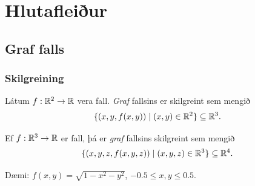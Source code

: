 
\theoremstyle{definition}
\newtheorem{exercise}[theorem]{}





\newbox\mytempbox
\newdimen\mytempdimen

\newcommand\includegraphicscopyright[3][]{%
  \leavevmode\vbox{\vskip3pt\raggedright\setbox\mytempbox=\hbox{\texttt{[image: \#2]}}%
    \mytempdimen=\wd\mytempbox\box\mytempbox\par\vskip1pt%
    \fontsize{3}{3.5}\selectfont{\color{black!25}{\vbox{\hsize=\mytempdimen#3}}}\vskip3pt%
}}

\newenvironment{colortabular}[1]{\medskip\rowcolors[]{1}{blue!20}{blue!10}\tabular{#1}\rowcolor{blue!40}}{\endtabular\medskip}

\def\equad{\leavevmode\hbox{}\quad}

\newenvironment{greencolortabular}[1]
{\medskip\rowcolors[]{1}{green!50!black!20}{green!50!black!10}%
  \tabular{#1}\rowcolor{green!50!black!40}}%
{\endtabular\medskip}





\section{Hlutafleiður}


\subsection{Graf falls} 

\subsubsection{Skilgreining }
Látum $f:{\mathbb R}^2\rightarrow {\mathbb R}$ vera fall.  {\em Graf} fallsins er skilgreint sem mengið 
$$\{(x,y,f(x,y))\mid (x,y)\in{\mathbb R}^2\}\subseteq {\mathbb R}^3.$$

Ef $f:{\mathbb R}^3\rightarrow {\mathbb R}$ er fall, þá er  {\em graf} fallsins skilgreint sem mengið 
$$\{(x,y,z,f(x,y,z))\mid (x,y,z)\in{\mathbb R}^3\}\subseteq {\mathbb R}^4.$$

            
 Dæmi: $f(x,y) = \sqrt{1-x^2-y^2}$, $-0.5\leq x,y\leq 0.5$.         

